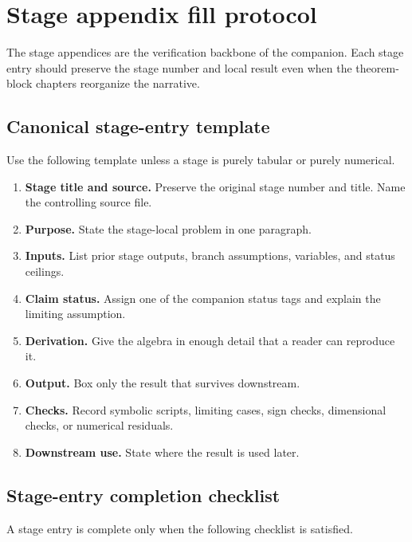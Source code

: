 \section{Stage appendix fill protocol}
\label{sec:stage-appendix-fill-protocol}

The stage appendices are the verification backbone of the companion.  Each stage entry should preserve the stage number and local result even when the theorem-block chapters reorganize the narrative.

\subsection{Canonical stage-entry template}
\label{subsec:canonical-stage-entry-template}

Use the following template unless a stage is purely tabular or purely numerical.

\begin{enumerate}[leftmargin=2.0em]
\item \textbf{Stage title and source.}  Preserve the original stage number and title.  Name the controlling source file.
\item \textbf{Purpose.}  State the stage-local problem in one paragraph.
\item \textbf{Inputs.}  List prior stage outputs, branch assumptions, variables, and status ceilings.
\item \textbf{Claim status.}  Assign one of the companion status tags and explain the limiting assumption.
\item \textbf{Derivation.}  Give the algebra in enough detail that a reader can reproduce it.
\item \textbf{Output.}  Box only the result that survives downstream.
\item \textbf{Checks.}  Record symbolic scripts, limiting cases, sign checks, dimensional checks, or numerical residuals.
\item \textbf{Downstream use.}  State where the result is used later.
\end{enumerate}

\subsection{Stage-entry completion checklist}
\label{subsec:stage-entry-completion-checklist}

A stage entry is complete only when the following checklist is satisfied.

